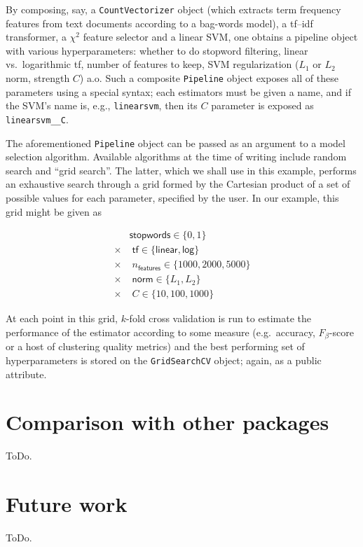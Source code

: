 \documentclass[a4paper]{article}
\DeclareRobustCommand{\VAN}[3]{#2}
\begin{document}
By composing, say, a \texttt{CountVectorizer} object
(which extracts term frequency features from text documents
according to a bag-words model),
a \textsf{tf--idf} transformer, a $\chi^2$ feature selector and a linear SVM,
one obtains a pipeline object with various hyperparameters:
whether to do stopword filtering,
linear vs.\ logarithmic \textsf{tf}, number of features to keep,
SVM regularization ($L_1$ or $L_2$ norm, strength $C$) a.o.
Such a composite \texttt{Pipeline} object
exposes all of these parameters using a special syntax;
each estimators must be given a name,
and if the SVM's name is, e.g., \texttt{linearsvm},
then its $C$ parameter is exposed as \texttt{linearsvm\_\_C}.

The aforementioned \texttt{Pipeline} object
can be passed as an argument to a model selection algorithm.
Available algorithms at the time of writing include random search
\citep{bergstra2012} and ``grid search''.
The latter, which we shall use in this example,
performs an exhaustive search through a grid formed by the Cartesian product
of a set of possible values for each parameter, specified by the user.
In our example, this grid might be given as

\begin{align*}
         & \textsf{stopwords} \in \{0, 1\}                      \\
  \times & \; \textsf{tf} \in \{\textsf{linear}, \textsf{log}\} \\
  \times & \; n_\textsf{features} \in \{1000, 2000, 5000\}      \\
  \times & \; \textsf{norm} \in \{L_1, L_2\}                    \\
  \times & \; C \in \{10, 100, 1000\}
\end{align*}

At each point in this grid, $k$-fold cross validation is run
to estimate the performance of the estimator according to some measure
(e.g.\ accuracy, $F_\beta$-score or a host of clustering quality metrics)
and the best performing set of hyperparameters is stored
on the \texttt{GridSearchCV} object; again, as a public attribute.

\section{Comparison with other packages}

ToDo.

\section{Future work}

ToDo.


\DeclareRobustCommand{\VAN}[3]{#3}

\end{document}
